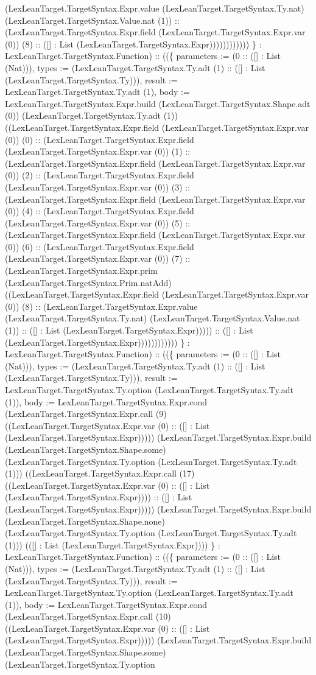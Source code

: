 \documentclass[11pt]{article}
\begin{document}
(LexLeanTarget.TargetSyntax.Expr.value (LexLeanTarget.TargetSyntax.Ty.nat) (LexLeanTarget.TargetSyntax.Value.nat (1)) :: (LexLeanTarget.TargetSyntax.Expr.field (LexLeanTarget.TargetSyntax.Expr.var (0)) (8) :: ([] : List (LexLeanTarget.TargetSyntax.Expr)))))))))))) \} : LexLeanTarget.TargetSyntax.Function) :: ((\{ parameters := (0 :: ([] : List (Nat))), types := (LexLeanTarget.TargetSyntax.Ty.adt (1) :: ([] : List (LexLeanTarget.TargetSyntax.Ty))), result := LexLeanTarget.TargetSyntax.Ty.adt (1), body := LexLeanTarget.TargetSyntax.Expr.build (LexLeanTarget.TargetSyntax.Shape.adt (0)) (LexLeanTarget.TargetSyntax.Ty.adt (1)) ((LexLeanTarget.TargetSyntax.Expr.field (LexLeanTarget.TargetSyntax.Expr.var (0)) (0) :: (LexLeanTarget.TargetSyntax.Expr.field (LexLeanTarget.TargetSyntax.Expr.var (0)) (1) :: (LexLeanTarget.TargetSyntax.Expr.field (LexLeanTarget.TargetSyntax.Expr.var (0)) (2) :: (LexLeanTarget.TargetSyntax.Expr.field (LexLeanTarget.TargetSyntax.Expr.var (0)) (3) :: (LexLeanTarget.TargetSyntax.Expr.field (LexLeanTarget.TargetSyntax.Expr.var (0)) (4) :: (LexLeanTarget.TargetSyntax.Expr.field (LexLeanTarget.TargetSyntax.Expr.var (0)) (5) :: (LexLeanTarget.TargetSyntax.Expr.field (LexLeanTarget.TargetSyntax.Expr.var (0)) (6) :: (LexLeanTarget.TargetSyntax.Expr.field (LexLeanTarget.TargetSyntax.Expr.var (0)) (7) :: (LexLeanTarget.TargetSyntax.Expr.prim (LexLeanTarget.TargetSyntax.Prim.natAdd) ((LexLeanTarget.TargetSyntax.Expr.field (LexLeanTarget.TargetSyntax.Expr.var (0)) (8) :: (LexLeanTarget.TargetSyntax.Expr.value (LexLeanTarget.TargetSyntax.Ty.nat) (LexLeanTarget.TargetSyntax.Value.nat (1)) :: ([] : List (LexLeanTarget.TargetSyntax.Expr))))) :: ([] : List (LexLeanTarget.TargetSyntax.Expr)))))))))))) \} : LexLeanTarget.TargetSyntax.Function) :: ((\{ parameters := (0 :: ([] : List (Nat))), types := (LexLeanTarget.TargetSyntax.Ty.adt (1) :: ([] : List (LexLeanTarget.TargetSyntax.Ty))), result := LexLeanTarget.TargetSyntax.Ty.option (LexLeanTarget.TargetSyntax.Ty.adt (1)), body := LexLeanTarget.TargetSyntax.Expr.cond (LexLeanTarget.TargetSyntax.Expr.call (9) ((LexLeanTarget.TargetSyntax.Expr.var (0) :: ([] : List (LexLeanTarget.TargetSyntax.Expr))))) (LexLeanTarget.TargetSyntax.Expr.build (LexLeanTarget.TargetSyntax.Shape.some) (LexLeanTarget.TargetSyntax.Ty.option (LexLeanTarget.TargetSyntax.Ty.adt (1))) ((LexLeanTarget.TargetSyntax.Expr.call (17) ((LexLeanTarget.TargetSyntax.Expr.var (0) :: ([] : List (LexLeanTarget.TargetSyntax.Expr)))) :: ([] : List (LexLeanTarget.TargetSyntax.Expr))))) (LexLeanTarget.TargetSyntax.Expr.build (LexLeanTarget.TargetSyntax.Shape.none) (LexLeanTarget.TargetSyntax.Ty.option (LexLeanTarget.TargetSyntax.Ty.adt (1))) (([] : List (LexLeanTarget.TargetSyntax.Expr)))) \} : LexLeanTarget.TargetSyntax.Function) :: ((\{ parameters := (0 :: ([] : List (Nat))), types := (LexLeanTarget.TargetSyntax.Ty.adt (1) :: ([] : List (LexLeanTarget.TargetSyntax.Ty))), result := LexLeanTarget.TargetSyntax.Ty.option (LexLeanTarget.TargetSyntax.Ty.adt (1)), body := LexLeanTarget.TargetSyntax.Expr.cond (LexLeanTarget.TargetSyntax.Expr.call (10) ((LexLeanTarget.TargetSyntax.Expr.var (0) :: ([] : List (LexLeanTarget.TargetSyntax.Expr))))) (LexLeanTarget.TargetSyntax.Expr.build (LexLeanTarget.TargetSyntax.Shape.some) (LexLeanTarget.TargetSyntax.Ty.option 
\end{document}
